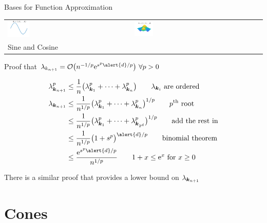 \documentclass[10pt,compress,xcolor={usenames,dvipsnames},aspectratio=169]{beamer}
\begin{document}
\begin{frame}{Bases for Function Approximation}
\begin{tabular}{>{\centering}m{}>{\centering}m{}>{\centering}m{}>{\centering}m{}>{\centering}m{}}
\includegraphics[width =0.18\textwidth]{ProgramsImages/CosineSine_Degree_1_k.png}  &
\includegraphics[width =0.18\textwidth]{ProgramsImages/CosineSine_Degree_1_1_k.png}   
\tabularnewline[-7ex]
Sine and Cosine \tabularnewline
	\end{tabular}
\end{frame}



\begin{frame}{Proof that $\lambda_{k_{n+1}} = \Order\bigl(n^{-1/p}\me^{s^p\alert{d}/p}\bigr) \ \forall p > 0$}

\vspace{-6ex}

\begin{align*}
    \lambda_{\vk_{n+1}}^p &\le \frac 1n \bigl( \lambda_{\vk_{1}}^p + \cdots + \lambda_{\vk_{n}}^p \bigr) \qquad \lambda_{\vk_{i}} \text{ are ordered} \\
    \lambda_{\vk_{n+1}} &\le \frac 1{n^{1/p}} \bigl( \lambda_{\vk_{1}}^p + \cdots + \lambda_{\vk_{n}}^p \bigr)^{1/p} \qquad p^{\text{th}} \text{ root} \\
     &\le \frac 1{n^{1/p}} \bigl( \lambda_{\vk_{1}}^p + \cdots + \lambda_{\vk_{2^d}}^p \bigr)^{1/p} \qquad  \text{add the rest in} \\
     &\le \frac 1{n^{1/p}} \bigl( 1 + s^p \bigr)^{\alert{d}/p} \qquad  \text{binomial theorem} \\
     & \le \frac {\me^{s^p\alert{d}/p}}{n^{1/p}} \qquad 1 + x \le \me^x \text{ for } x \ge 0
\end{align*}

There is a similar proof that provides a \alert{lower bound} on $\lambda_{\boldsymbol{k}_{n+1}}$
    
\end{frame}


\section{Cones}
\end{document}
